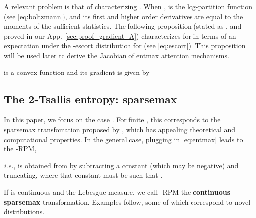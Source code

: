 \documentclass{article}
\newcommand{\remove}[1]{}
\begin{document}
\begin{comment}
In particular, a 2-sparse family takes the form:

where 
.
Note that  and that
 is the log-partition function (see \eqref{eq:boltzmann}).
\end{comment}








A relevant problem is that of characterizing . When , 
 is the log-partition function (see \eqref{eq:boltzmann}), and  its first and higher order derivatives are equal to the moments of the sufficient statistics. The following proposition (stated as \citet[Theorem~5]{amari2011geometry}, and proved in our App.~\ref{sec:proof_gradient_A}) 
characterizes  for  in terms of an expectation under the -escort distribution for  (see \eqref{eq:escort}). This proposition will be used later to derive the Jacobian of entmax attention mechanisms. \remove{and the gradient and Hessian of Fenchel-Young losses.}


\vspace{0.3cm}

\begin{proposition}\label{prop:gradient_A}
 is a convex function and its gradient is given by

\end{proposition}







\subsection{The 2-Tsallis entropy: sparsemax}\label{sec:sparsemax}

In this paper, we focus on the case . For finite , this corresponds to the sparsemax transfomation proposed by \citet{Martins2016ICML}, 
which has appealing  theoretical and computational properties. 
In the general case, 
plugging  in \eqref{eq:entmax} leads to the -RPM,

\textit{i.e.},  is obtained from  by subtracting a constant (which may be negative) and truncating, where that constant  must be such that . 
\remove{For the discrete case, this constant has been called the \textit{threshold function} by \citet{Martins2016ICML}.}

If  is continuous and  the Lebesgue measure, we call -RPM the {\bf continuous sparsemax} transformation. Examples follow, some of which correspond to  novel distributions.
\end{document}
